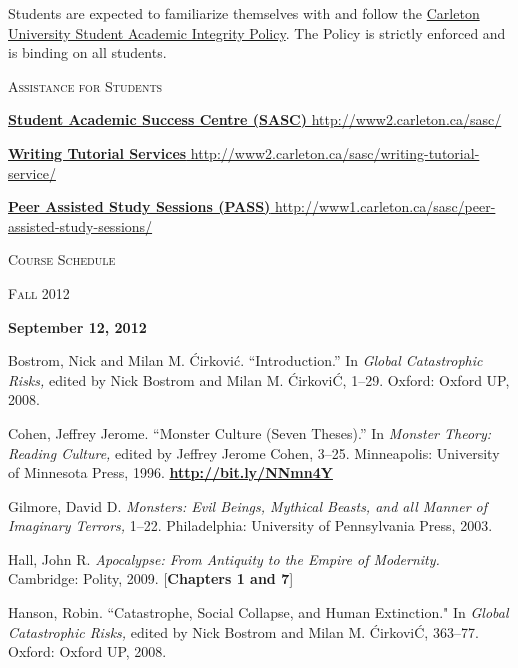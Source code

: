 \documentclass[12pt]{article}
\begin{document}
Students are expected to familiarize themselves with and follow the \href{http://www2.carleton.ca/studentaffairs/academic-integrity}{Carleton University Student Academic Integrity Policy}. The Policy is strictly enforced and is binding on all students.

{\large \textsc{Assistance for Students}}

\href{http://www2.carleton.ca/sasc/}{\textbf{Student Academic Success Centre (SASC)} http://www2.carleton.ca/sasc/}

\href{http://www2.carleton.ca/sasc/writing-tutorial-service/}{\textbf{Writing Tutorial Services} http://www2.carleton.ca/sasc/writing-tutorial-service/} 

\href{http://www1.carleton.ca/sasc/peer-assisted-study-sessions/}{\textbf{Peer Assisted Study Sessions (PASS)} http://www1.carleton.ca/sasc/peer-assisted-study-sessions/}

\newpage

\begin{center}
{\Large \textsc{Course Schedule}}

\vspace{.125in}

{\Large \textsc{Fall 2012}}
\end{center}

\vspace{.25in}

\textbf{September 12, 2012}

\begin{hangparas}{.5in}{1}
Bostrom, Nick and Milan M. \'Cirkovi\'c. ``Introduction.'' In \textit{Global Catastrophic Risks,} edited by Nick Bostrom and Milan M. \'Cirkovi\'C, 1--29. Oxford: Oxford UP, 2008.

Cohen, Jeffrey Jerome. ``Monster Culture (Seven Theses).'' In \textit{Monster Theory: Reading Culture,} edited by Jeffrey Jerome Cohen, 3--25. Minneapolis: University of Minnesota Press, 1996. \href{http://bit.ly/NNmn4Y}{\textbf{http://bit.ly/NNmn4Y}}

Gilmore, David D. \textit{Monsters: Evil Beings, Mythical Beasts, and all Manner of Imaginary Terrors,} 1--22. Philadelphia: University of Pennsylvania Press, 2003.

Hall, John R. \textit{Apocalypse: From Antiquity to the Empire of Modernity.} Cambridge: Polity, 2009. [\textbf{Chapters 1 and 7}]

Hanson, Robin. ``Catastrophe, Social Collapse, and Human Extinction." In \textit{Global Catastrophic Risks,} edited by Nick Bostrom and Milan M. \'Cirkovi\'C, 363--77. Oxford: Oxford UP, 2008.
\end{hangparas}
\end{document}
